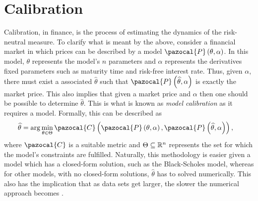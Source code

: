 \section{Calibration}\label{Sec.Calibration}
Calibration, in finance, is the process of estimating the dynamics of the risk-neutral measure. To clarify what is meant by the above, consider a financial market in which prices can be described by a model $\pazocal{P}\left(\theta,\alpha\right)$. In this model, $\theta$ represents the model's $n$ parameters and $\alpha$ represents the derivatives fixed parameters such as maturity time and risk-free interest rate. Thus, given $\alpha$, there must exist a associated $\widehat{\theta}$ such that $\pazocal{P}\left(\widehat{\theta},\alpha\right)$ is exactly the market price. This also implies that given a market price and $\alpha$ then one should be possible to determine $\widehat{\theta}$. This is what is known as \emph{model calibration} as it requires a model. Formally, this can be described as
\begin{align*}
    \widehat{\theta} &= \arg\min_{\theta\in\Theta}\pazocal{C}\left(\pazocal{P}\left(\theta,\alpha\right),\pazocal{P}\left(\widehat{\theta},\alpha\right)\right),
\end{align*}
where $\pazocal{C}$ is a suitable metric and $\Theta\subseteq\mathbb{R}^n$ represents the set for which the model's constraints are fulfilled. Naturally, this methodology is easier given a model which has a closed-form solution, such as the Black-Scholes model, whereas for other models, with no closed-form solutions, $\widehat{\theta}$ has to solved numerically. This also has the implication that as data sets get larger, the slower the numerical approach becomes \citep{Art}.


